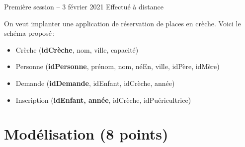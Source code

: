 %
{Première session  -- 3 février 2021}%
{Effectué à distance}%


On veut implanter une application de réservation de places en crèche. Voici le schéma proposé\,:

\begin{itemize}
  \item Crèche (\textbf{idCrèche}, nom, ville, capacité)
   \item Personne (\textbf{idPersonne}, prénom, nom, néEn, ville, idPère, idMère)
  \item Demande (\textbf{idDemande}, idEnfant, idCrèche, année)
  \item Inscription (\textbf{idEnfant, année}, idCrèche, idPuéricultrice)
   
\end{itemize}

\section{Modélisation (8 points)}


